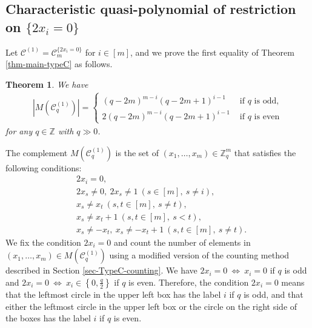 \documentclass{article}
\theoremstyle{plain}
\newtheorem{Them}{Theorem}[section]
\theoremstyle{definition}
\theoremstyle{remark}
\numberwithin{equation}{section}
\newcommand{\Cc}{\mathcal{C}}
\begin{document}
\subsection{Characteristic quasi-polynomial of restriction on $\{2x_i=0\}$}\label{sec-TypeC-rest-2x_i=0}
Let $\Cc^{(1)}=\mathcal{C}_m^{\{2x_i=0\}}$ for $i\in [m]$, and we prove the first equality of Theorem \ref{thm-main-typeC} as follows.
\begin{Them}\label{thm-char-quasi-TypeC-2xi=0}
We have
\begin{align*}
\left|M(\Cc_q^{(1)})\right|=
\begin{cases}
(q-2m)^{m-i}(q-2m+1)^{i-1}\;\;\;&\text{if $q$ is odd}, \\
2(q-2m)^{m-i}(q-2m+1)^{i-1} &\text{if $q$ is even}
\end{cases}
\end{align*}
for any $q\in\mathbb{Z}$ with $q\gg 0$.
\end{Them}
The complement $M(\Cc^{(1)}_q)$ is the set of $(x_1,\dots,x_m)\in\mathbb{Z}_q^m$ that satisfies the following conditions:
\begin{align*}
&2x_i=0,\\
&2x_s\neq 0,\ 2x_s\neq 1\ (s\in [m],\ s\neq i),\\
&x_s\neq x_t\ (s,t\in [m],\ s\neq t),\\
&x_s\neq x_t+1\ (s,t\in [m],\ s<t),\\
&x_s\neq -x_t,\ x_s\neq -x_t+1\ (s,t\in [m],\ s\neq t).
\end{align*}
We fix the condition $2x_i=0$ and count the number of elements in $(x_1,\dots,x_m)\in M(\Cc^{(1)}_q)$ using a modified version of the counting method described in Section \ref{sec-TypeC-counting}.
We have $2x_i=0\ \Leftrightarrow\ x_i=0$ if $q$ is odd and $\displaystyle 2x_i=0\ \Leftrightarrow\ x_i\in \left\{0,\frac{q}{2}\right\}$ if $q$ is even.
Therefore, the condition $2x_i=0$ means that the leftmost circle in the upper left box has the label $i$ if $q$ is odd, and that either the leftmost circle in the upper left box or the circle on the right side of the boxes has the label $i$ if $q$ is even. 
\end{document}
